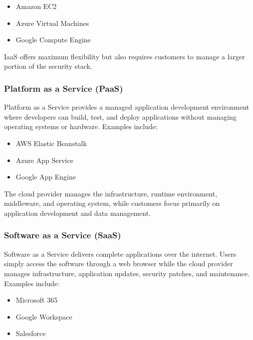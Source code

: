 \begin{itemize}
\tightlist
\item
  Amazon EC2\\
\item
  Azure Virtual Machines\\
\item
  Google Compute Engine
\end{itemize}

IaaS offers maximum flexibility but also requires customers to manage a larger portion of the security stack.

\subsubsection{Platform as a Service (PaaS)}

Platform as a Service provides a managed application development environment where developers can build, test, and deploy applications without managing operating systems or hardware. Examples include:

\begin{itemize}
\tightlist
\item
  AWS Elastic Beanstalk\\
\item
  Azure App Service\\
\item
  Google App Engine
\end{itemize}

The cloud provider manages the infrastructure, runtime environment, middleware, and operating system, while customers focus primarily on application development and data management.

\subsubsection{Software as a Service (SaaS)}

Software as a Service delivers complete applications over the internet. Users simply access the software through a web browser while the cloud provider manages infrastructure, application updates, security patches, and maintenance. Examples include:

\begin{itemize}
\tightlist
\item
  Microsoft 365\\
\item
  Google Workspace\\
\item
  Salesforce
\end{itemize}

